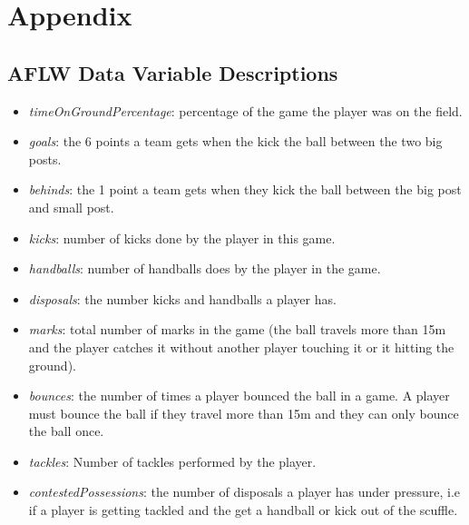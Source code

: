 \hypertarget{appendix}{%
\section{Appendix}\label{appendix}}

\hypertarget{aflw-data-variable-descriptions}{%
\subsection{AFLW Data Variable
Descriptions}\label{aflw-data-variable-descriptions}}

\begin{itemize}
\tightlist
\item
  \emph{timeOnGroundPercentage}: percentage of the game the player was
  on the field.\\
\item
  \emph{goals}: the 6 points a team gets when the kick the ball between
  the two big posts.\\
\item
  \emph{behinds}: the 1 point a team gets when they kick the ball
  between the big post and small post.\\
\item
  \emph{kicks}: number of kicks done by the player in this game.\\
\item
  \emph{handballs}: number of handballs does by the player in the
  game.\\
\item
  \emph{disposals}: the number kicks and handballs a player has.\\
\item
  \emph{marks}: total number of marks in the game (the ball travels more
  than 15m and the player catches it without another player touching it
  or it hitting the ground).\\
\item
  \emph{bounces}: the number of times a player bounced the ball in a
  game. A player must bounce the ball if they travel more than 15m and
  they can only bounce the ball once.\\
\item
  \emph{tackles}: Number of tackles performed by the player.\\
\item
  \emph{contestedPossessions}: the number of disposals a player has
  under pressure, i.e if a player is getting tackled and the get a
  handball or kick out of the scuffle.\\

\end{itemize}
